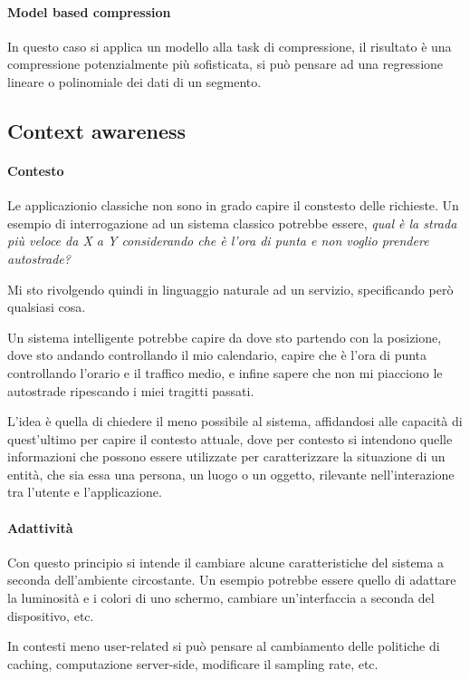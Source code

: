 \paragraph{Model based compression}
In questo caso si applica un modello alla task di compressione, il risultato è 
una compressione potenzialmente più sofisticata, 
si può pensare ad una regressione lineare o polinomiale dei dati di un 
segmento.

\subsection{Context awareness}

\paragraph{Contesto}
Le applicazionio classiche non sono in grado capire il constesto delle richieste.
Un esempio di interrogazione ad un sistema classico 
potrebbe essere, \emph{qual è la strada più veloce da X a Y considerando 
che è l'ora di punta e non voglio prendere autostrade?}

Mi sto rivolgendo quindi in linguaggio naturale ad un servizio, specificando però 
qualsiasi cosa.

Un sistema intelligente potrebbe capire da dove sto partendo con la posizione, 
dove sto andando controllando il mio calendario, capire che è l'ora di punta controllando 
l'orario e il traffico medio, e infine sapere che non mi piacciono le autostrade 
ripescando i miei tragitti passati.

L'idea è quella di chiedere il meno possibile al sistema, affidandosi alle 
capacità di quest'ultimo per capire il contesto attuale, dove per contesto 
si intendono quelle informazioni che possono essere utilizzate per caratterizzare 
la situazione di un entità, che sia essa una persona, un luogo o un oggetto, rilevante 
nell'interazione tra l'utente e l'applicazione.

\paragraph{Adattività}
Con questo principio si intende il cambiare alcune caratteristiche del sistema 
a seconda dell'ambiente circostante. Un esempio potrebbe essere quello 
di adattare la luminosità e i colori di uno schermo, 
cambiare un'interfaccia a seconda del dispositivo, etc.

In contesti meno user-related si può pensare al cambiamento delle politiche di caching, 
computazione server-side, modificare il sampling rate, etc.

